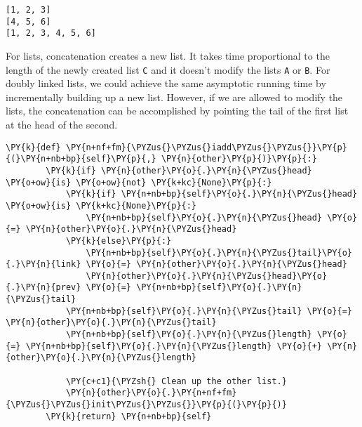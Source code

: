 \begin{Verbatim}
[1, 2, 3]
[4, 5, 6]
[1, 2, 3, 4, 5, 6]
\end{Verbatim}


For lists, concatenation creates a new list.
It takes time proportional to the length of the newly created list \texttt{C} and it doesn't modify the lists \texttt{A} or \texttt{B}.
For doubly linked lists, we could achieve the same asymptotic running time by incrementally building up a new list.
However, if we are allowed to modify the lists, the concatenation can be accomplished by pointing the tail of the first list at the head of the second.

\begin{Verbatim}[commandchars=\\\{\}]
    \PY{k}{def} \PY{n+nf+fm}{\PYZus{}\PYZus{}iadd\PYZus{}\PYZus{}}\PY{p}{(}\PY{n+nb+bp}{self}\PY{p}{,} \PY{n}{other}\PY{p}{)}\PY{p}{:}
        \PY{k}{if} \PY{n}{other}\PY{o}{.}\PY{n}{\PYZus{}head} \PY{o+ow}{is} \PY{o+ow}{not} \PY{k+kc}{None}\PY{p}{:}
            \PY{k}{if} \PY{n+nb+bp}{self}\PY{o}{.}\PY{n}{\PYZus{}head} \PY{o+ow}{is} \PY{k+kc}{None}\PY{p}{:}
                \PY{n+nb+bp}{self}\PY{o}{.}\PY{n}{\PYZus{}head} \PY{o}{=} \PY{n}{other}\PY{o}{.}\PY{n}{\PYZus{}head}
            \PY{k}{else}\PY{p}{:}
                \PY{n+nb+bp}{self}\PY{o}{.}\PY{n}{\PYZus{}tail}\PY{o}{.}\PY{n}{link} \PY{o}{=} \PY{n}{other}\PY{o}{.}\PY{n}{\PYZus{}head}
                \PY{n}{other}\PY{o}{.}\PY{n}{\PYZus{}head}\PY{o}{.}\PY{n}{prev} \PY{o}{=} \PY{n+nb+bp}{self}\PY{o}{.}\PY{n}{\PYZus{}tail}
            \PY{n+nb+bp}{self}\PY{o}{.}\PY{n}{\PYZus{}tail} \PY{o}{=} \PY{n}{other}\PY{o}{.}\PY{n}{\PYZus{}tail}
            \PY{n+nb+bp}{self}\PY{o}{.}\PY{n}{\PYZus{}length} \PY{o}{=} \PY{n+nb+bp}{self}\PY{o}{.}\PY{n}{\PYZus{}length} \PY{o}{+} \PY{n}{other}\PY{o}{.}\PY{n}{\PYZus{}length}

            \PY{c+c1}{\PYZsh{} Clean up the other list.}
            \PY{n}{other}\PY{o}{.}\PY{n+nf+fm}{\PYZus{}\PYZus{}init\PYZus{}\PYZus{}}\PY{p}{(}\PY{p}{)}
        \PY{k}{return} \PY{n+nb+bp}{self}
\end{Verbatim}




